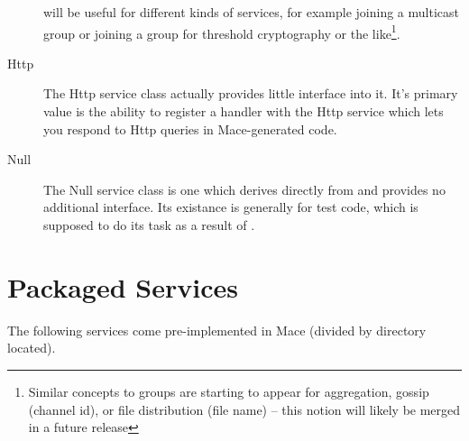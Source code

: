 \begin{description}
  will be useful for different kinds of services, for example joining a
  multicast group or joining a group for threshold cryptography or the
  like\footnote{Similar concepts to groups are starting to appear for
  aggregation, gossip (channel id), or file distribution (file name) -- this
  notion will likely be merged in a future release}.
\item[Http] The Http service class actually provides little interface into it.  It's primary value 
  is the ability to register a handler with the Http service which lets you respond to Http
  queries in Mace-generated code.
\item[Null] The Null service class is one which derives directly from  and
  provides no additional interface.  Its existance is generally for test code, 
  which is supposed to do its task as a result of .
\end{description}

\section{Packaged Services}
\label{sec:packaged-services}

The following services come pre-implemented in Mace (divided by directory located).

